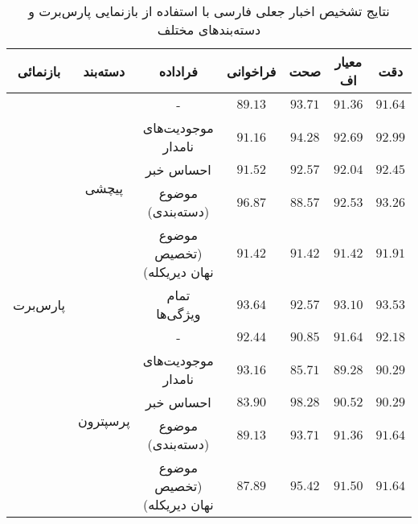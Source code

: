 \begin{table}[h!]
	\caption{نتایج تشخیص اخبار جعلی فارسی با استفاده از بازنمایی پارس‌برت و دسته‌بندهای مختلف}
	\label{table.results_meta}
	\begin{center}
		\begin{tabular}{|c|c|c|c|c|c|c|}
			\hline
			بازنمائی & دسته‌بند & فراداده & فراخوانی & صحت & معیار اف & دقت \\
			\hline
			\hline
			\multirow{11}{*}{پارس‌برت} & \multirow{5}{*}{پیچشی}
			& - & $89.13$ & $93.71$ & $91.36$ & $91.64$ \\
			\cline{3-7}
			&  & موجودیت‌های نامدار & $91.16$& $94.28$ & $92.69$ & $92.99$ \\
		\cline{3-7}
			&  & احساس‌ خبر & $91.52$ & $92.57$ & $92.04$ & $92.45$ \\
			\cline{3-7}
			 &  & موضوع  (دسته‌بندی) & $96.87$ & $88.57$ & $92.53$ & $93.26$ \\
			\cline{3-7}
		 &  & موضوع  (تخصیص نهان دیریکله) & $91.42$ & $91.42$  & $91.42$  & $91.91$  \\
			\cline{3-7}
			&  & تمام ویژگی‌ها & $93.64$ & $92.57$ & $93.10$ & $93.53$ \\
			\cline{2-7}
			& \multirow{5}{*}{پرسپترون}
			& - & $92.44$ & $90.85$ & $91.64$ & $92.18$ \\
			\cline{3-7}
			&  &موجودیت‌های نامدار & $93.16$ & $85.71$ & $89.28$ & $90.29$ \\
			\cline{3-7}
			&  &احساس‌ خبر & $83.90$ & $98.28$ & $90.52 $ & $90.29$ \\
			\cline{3-7}
		&  & موضوع  (دسته‌بندی) & $89.13$ & $93.71$ & $91.36$ & $91.64$ \\
			\cline{3-7}
			&  & موضوع  (تخصیص نهان دیریکله)  & $87.89 $ & $95.42$ & $91.50$ & $91.64$ \\
			\hline
		\end{tabular}
	\end{center}
\end{table}